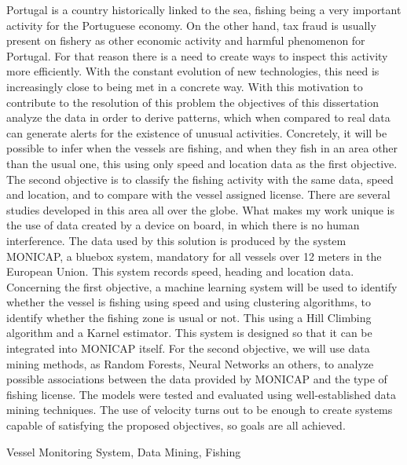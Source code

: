 \abstractEN %

Portugal is a country historically linked to the sea, fishing being a very important activity for the Portuguese economy. On the other hand, tax fraud is usually present on fishery as other economic activity and harmful phenomenon for Portugal. For that reason there is a need to create ways to inspect this activity more efficiently. With the constant evolution of new technologies, this need is increasingly close to being met in a concrete way.
With this motivation to contribute to the resolution of this problem the objectives of this dissertation analyze the data in order to derive patterns, which when compared to real data can generate alerts for the existence of unusual activities. Concretely, it will be possible to infer when the vessels are fishing, and when they fish in an area other than the usual one, this using only speed and location data as the first objective. The second objective is to classify the fishing activity with the same data, speed and location, and to compare with the vessel assigned license.
There are several studies developed in this area all over the globe. What makes my work unique is the use of data created by a device on board, in which there is no human interference. 
The data used by this solution is produced by the system MONICAP, a bluebox system, mandatory for all vessels over 12 meters in the European Union. This system records speed, heading and location data.
Concerning the first objective, a machine learning system will be used to identify whether
the vessel is fishing using speed and using clustering algorithms, to identify whether
the fishing zone is usual or not. This using a Hill Climbing algorithm and a Karnel estimator. This system is designed so that it can be integrated into MONICAP itself. For the second objective, we will use data mining methods, as Random Forests, Neural Networks an others, to analyze possible associations between the data provided by MONICAP and the type of fishing
license.
The models were tested and evaluated using well-established data mining techniques.
The use of velocity turns out to be enough to create systems capable of satisfying
the proposed objectives, so goals are all achieved.



\begin{keywords}
Vessel Monitoring System, Data Mining, Fishing
\end{keywords} 

